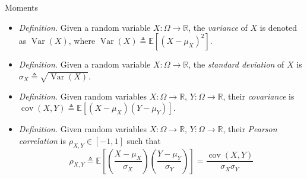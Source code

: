 \documentclass{beamer}
\numberwithin{equation}{section}
\begin{document}
\begin{frame}{Moments}
    \begin{itemize}
        \item
        \textit{Definition.} Given a random variable $ X : \Omega \rightarrow
        \mathbb{R} $, the \textit{variance} of $ X $ is denoted as
        $ \operatorname{Var}(X) $, where $ \operatorname{Var}(X) \triangleq
        \mathbb{E}\left[(X - \mu_X)^2\right] $.

        \item
        \textit{Definition.} Given a random variable $ X : \Omega \rightarrow
        \mathbb{R} $, the \textit{standard deviation} of $ X $ is
        $ \sigma_X \triangleq \sqrt{\operatorname{Var}(X)} $.

        \item
        \textit{Definition.} Given random variables
        $ X : \Omega \rightarrow \mathbb{R} $,
        $ Y : \Omega \rightarrow \mathbb{R} $, their \textit{covariance} is
        $ \operatorname{cov}(X, Y) \triangleq
        \mathbb{E}[(X - \mu_X)(Y - \mu_Y)] $.

        \item
        \textit{Definition.} Given random variables $ X : \Omega \rightarrow
        \mathbb{R} $, $ Y : \Omega \rightarrow \mathbb{R} $, their
        \textit{Pearson correlation} is $ \rho_{X, Y} \in [-1, 1] $ such that
        \begin{equation*}
            \rho_{X, Y} \triangleq \mathbb{E}\left[
                \left(\frac{X - \mu_X}{\sigma_X}\right)
                \left(\frac{Y - \mu_Y}{\sigma_Y}\right)
            \right] = \frac{\operatorname{cov}(X, Y)}{\sigma_X\sigma_Y}
        \end{equation*}
    \end{itemize}
\end{frame}
\end{document}
